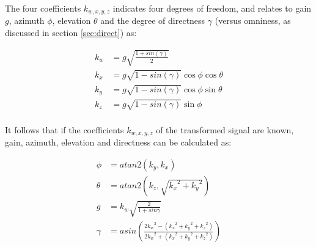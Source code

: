 \documentclass{article}
\begin{document}
The four coefficients $k_{w, x, y, z}$ indicates four degrees of freedom, and relates to gain $g$, azimuth $\phi$, elevation $\theta$ and the degree of directness $\gamma$ (versus omniness, as discussed in section \ref{sec:direct}) as:

\begin{equation} \label{eq:encodedCoefficients}
\begin{split}
k_w & = g \sqrt{ \frac{1 + sin(\gamma)} {2} } \\
k_x & = g \sqrt{ 1 - sin(\gamma) } \cos{\phi} \cos{\theta} \\
k_y & = g \sqrt{ 1 - sin(\gamma) } \cos{\phi} \sin{\theta} \\
k_z & = g \sqrt{ 1 - sin(\gamma) } \sin{\phi}               \\
\end{split}
\end{equation}

It follows that if the coefficients $k_{w, x, y, z}$ of the transformed signal are known, gain, azimuth, elevation and directness can be calculated as:

\begin{equation} \label{eq:interpreteCoefficients}
\begin{split}
\phi   & = atan2(k_y, k_x) \\
\theta & = atan2(k_z, \sqrt{{k_x}^2 + {k_y}^2}) \\
g      & = k_w \sqrt{ \frac{2}{1 + sin \gamma} } \\
\gamma & = asin( \frac{2 {k_w}^2 - ({k_x}^2 + {k_y}^2 +{k_z}^2)} {2 {k_w}^2 + ({k_x}^2 + {k_y}^2 +{k_z}^2 )})
\end{split}
\end{equation}
\end{document}
